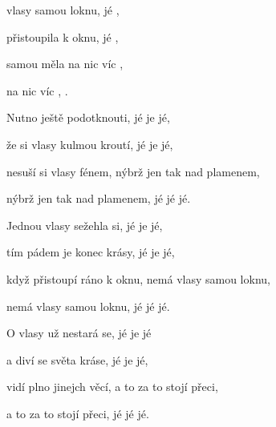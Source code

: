 

\zs
{} vlasy samou loknu, jé ,

 přistoupila k oknu, jé ,

 samou  měla  na nic víc ,

 na nic víc ,   .
\ks

\zs
Nutno ještě podotknouti, jé je jé,

že si vlasy kulmou kroutí, jé je jé,

nesuší si vlasy fénem, nýbrž jen tak nad plamenem,

nýbrž jen tak nad plamenem, jé jé jé.
\ks

\zs
Jednou vlasy sežehla si, jé je jé,

tím pádem je konec krásy, jé je jé,

když přistoupí ráno k oknu, nemá vlasy samou loknu,

nemá vlasy samou loknu, jé jé jé.
\ks

\zs
O vlasy už nestará se, jé je jé

a diví se světa kráse, jé je jé,

vidí plno jinejch věcí, a to za to stojí přeci,

a to za to stojí přeci, jé jé jé.
\ks

\kp





